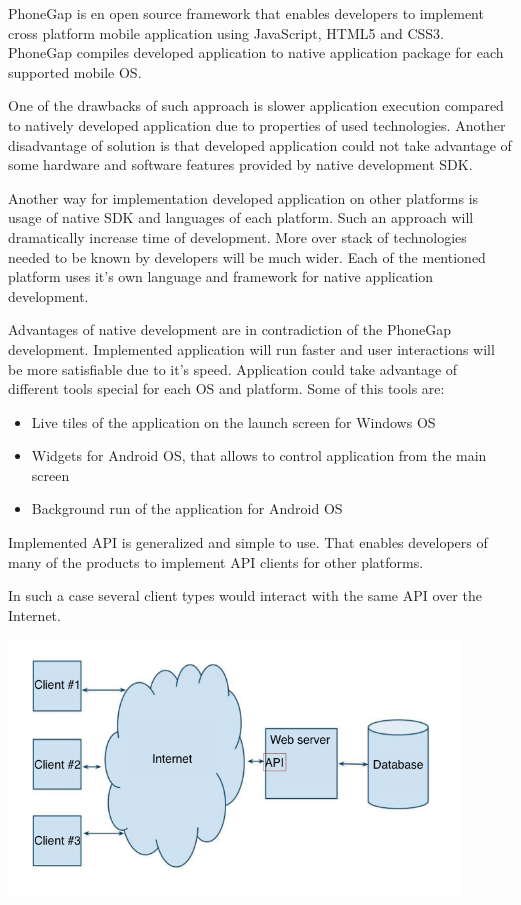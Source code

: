 \documentclass[thesis=M,english]{FITthesis}[2012/10/20]
\begin{document}
PhoneGap is en open source framework that enables developers to implement cross platform mobile application using JavaScript, HTML5 and CSS3. PhoneGap compiles developed application to native application package for each supported mobile OS.

One of the drawbacks of such approach is slower application execution compared to natively developed application due to properties of used technologies. Another disadvantage of solution is that developed application could not take advantage of some hardware and software features provided by native development SDK.

Another way for implementation developed application on other platforms is usage of native SDK and languages of each platform. Such an approach will dramatically increase time of development. More over stack of technologies needed to be known by developers will be much wider. Each of the mentioned platform uses it's own language and framework for native application development.

Advantages of native development are in contradiction of the PhoneGap development. Implemented application will run faster and user interactions will be more satisfiable due to it's speed. Application could take advantage of different tools special for each OS and platform. Some of this tools are:
\begin{itemize}
	\item Live tiles of the application on the launch screen for Windows OS
	\item Widgets for Android OS, that allows to control application from the main screen
	\item Background run of the application for Android OS 
\end{itemize} 

Implemented API is generalized and simple to use. That enables developers of many of the products to implement API clients for other platforms. 

In such a case several client types would interact with the same API over the Internet.


\includegraphics[width=0.9\textwidth]{images/extended_architecture}
\end{document}
